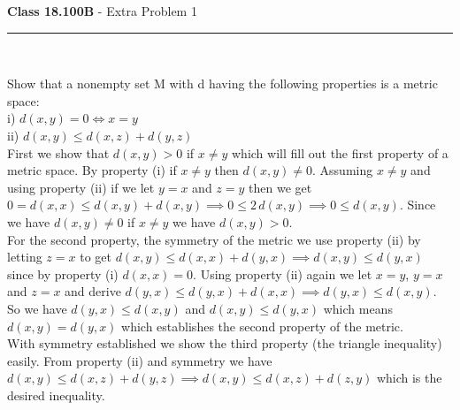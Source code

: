 \documentclass[11pt,reqno]{article}
\begin{document}
\vspace{15pt}
\begin{flushleft} 
\textbf{Class 18.100B} - Extra Problem 1\\
\rule{500pt}{1pt}\\
\end{flushleft} 
Show that a nonempty set M with d having the following properties is a metric space: \\
i) $d(x,y) = 0 \iff x = y$\\
ii) $d(x,y) \le d(x,z) + d(y,z)$ \\ \newline
\indent First we show that $d(x,y) > 0$ if $x \neq y$ which will fill out the first property of a metric space. By property (i) if $x \neq y$ then $d(x,y) \neq 0$. Assuming $x \neq y$ and using property (ii) if we let $y = x$ and $z = y$ then we get $0 = d(x,x) \le d(x,y) + d(x, y) \implies 0 \le 2 \,d(x,y) \implies 0 \le d(x,y)$. Since we have $d(x,y) \neq 0$ if $x \neq y$ we have $d(x,y) > 0$.\\
\indent For the second property, the symmetry of the metric we use property (ii) by letting $z = x$ to get $d(x,y) \le d(x,x) + d(y,x) \implies d(x,y) \le d(y,x)$ since by property (i) $d(x,x) = 0$. Using property (ii) again we let $x = y$, $y = x$ and $z = x$ and derive $d(y,x) \le d(y,x) + d(x,x) \implies d(y,x) \le d(x,y)$. So we have $d(y,x) \le d(x,y)$ and $d(x,y) \le d(y,x)$ which means $d(x,y) = d(y,x)$ which establishes the second property of the metric.\\
\indent With symmetry established we show the third property (the triangle inequality) easily. From property (ii) and symmetry we have $d(x,y) \le d(x,z) + d(y,z) \implies d(x,y) \le d(x,z) + d(z,y)$ which is the desired inequality.
\end{document}
